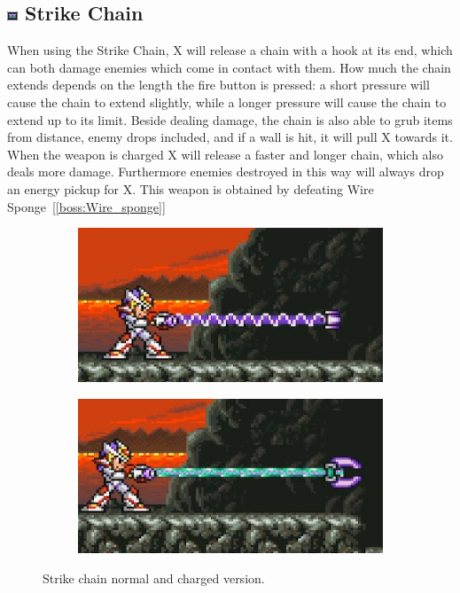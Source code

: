 \subsection{\includegraphics[width=12px, height=10px]{figures/X2/weapons/S_chain.png} Strike Chain}\label{Strike_chain}
When using the Strike Chain, X will release a chain with a hook at its end, which can both damage enemies which come in contact with them. How much the chain extends depends on the length the fire button is pressed: a short pressure will cause the chain to extend slightly, while a longer pressure will cause the chain to extend up to its limit. Beside dealing damage, the chain is also able to grub items from distance, enemy drops included, and if a wall is hit, it will pull X towards it. When the weapon is charged X will release a faster and longer chain, which also deals more damage. Furthermore enemies destroyed in this way will always drop an energy pickup for X. This weapon is obtained by defeating Wire Sponge~[\ref{boss:Wire_sponge}]

\begin{figure}[htp]
	\centering
	\begin{subfigure}{0.45\linewidth}
		\includegraphics[width=\linewidth]{figures/X2/weapons/S_chain_1.png}	
	\end{subfigure}
	\begin{subfigure}{0.45\linewidth}
		\centering
		\includegraphics[width=\linewidth]{figures/X2/weapons/S_chain_2.png}	
	\end{subfigure}
	\caption{Strike chain normal and charged version.}
\end{figure}


